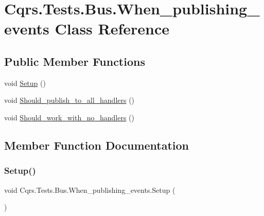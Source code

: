 \hypertarget{classCqrs_1_1Tests_1_1Bus_1_1When__publishing__events}{}\section{Cqrs.\+Tests.\+Bus.\+When\+\_\+publishing\+\_\+events Class Reference}
\label{classCqrs_1_1Tests_1_1Bus_1_1When__publishing__events}
\subsection*{Public Member Functions}
\begin{DoxyCompactItemize}
\item 
void \hyperlink{classCqrs_1_1Tests_1_1Bus_1_1When__publishing__events_addb2aa584a2bfe5c309e23bea1294fd8}{Setup} ()
\item 
void \hyperlink{classCqrs_1_1Tests_1_1Bus_1_1When__publishing__events_a61de6fab7f7e2c3b972dba53308ec8ef}{Should\+\_\+publish\+\_\+to\+\_\+all\+\_\+handlers} ()
\item 
void \hyperlink{classCqrs_1_1Tests_1_1Bus_1_1When__publishing__events_afc4e77f96cbb5529db243acfb6eed3ba}{Should\+\_\+work\+\_\+with\+\_\+no\+\_\+handlers} ()
\end{DoxyCompactItemize}


\subsection{Member Function Documentation}
\mbox{\label{classCqrs_1_1Tests_1_1Bus_1_1When__publishing__events_addb2aa584a2bfe5c309e23bea1294fd8}} 
\subsubsection{\texorpdfstring{Setup()}{Setup()}}
{\footnotesize\ttfamily void Cqrs.\+Tests.\+Bus.\+When\+\_\+publishing\+\_\+events.\+Setup (\begin{DoxyParamCaption}{ }\end{DoxyParamCaption})}

